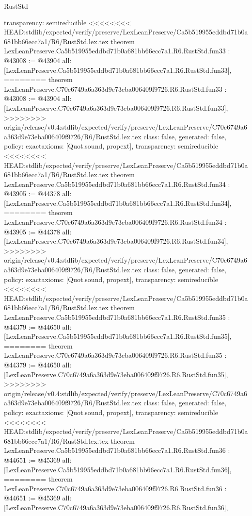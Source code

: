 \begin{lexlean}{RustStd}
\begin{coremodule}
{\begin{coremodule}
{{{{{{{{{{{{{{{{{{{{{{{{{{{{{{{{{{{{  transparency: semireducible
}
<<<<<<<< HEAD:stdlib/expected/verify/preserve/LexLeanPreserve/Ca5b519955eddbd71b0a681bb66ecc7a1/R6/RustStd.lex.tex
theorem LexLeanPreserve.Ca5b519955eddbd71b0a681bb66ecc7a1.R6.RustStd.fun33 : @43008 := @43904 {
  all: [LexLeanPreserve.Ca5b519955eddbd71b0a681bb66ecc7a1.R6.RustStd.fun33],
========
theorem LexLeanPreserve.C70c6749a6a363d9e73eba006409f9726.R6.RustStd.fun33 : @43008 := @43904 {
  all: [LexLeanPreserve.C70c6749a6a363d9e73eba006409f9726.R6.RustStd.fun33],
>>>>>>>> origin/release/v0.4:stdlib/expected/verify/preserve/LexLeanPreserve/C70c6749a6a363d9e73eba006409f9726/R6/RustStd.lex.tex
  class: false,
  generated: false,
  policy: exact{axioms: [Quot.sound, propext]},
  transparency: semireducible
}
<<<<<<<< HEAD:stdlib/expected/verify/preserve/LexLeanPreserve/Ca5b519955eddbd71b0a681bb66ecc7a1/R6/RustStd.lex.tex
theorem LexLeanPreserve.Ca5b519955eddbd71b0a681bb66ecc7a1.R6.RustStd.fun34 : @43905 := @44378 {
  all: [LexLeanPreserve.Ca5b519955eddbd71b0a681bb66ecc7a1.R6.RustStd.fun34],
========
theorem LexLeanPreserve.C70c6749a6a363d9e73eba006409f9726.R6.RustStd.fun34 : @43905 := @44378 {
  all: [LexLeanPreserve.C70c6749a6a363d9e73eba006409f9726.R6.RustStd.fun34],
>>>>>>>> origin/release/v0.4:stdlib/expected/verify/preserve/LexLeanPreserve/C70c6749a6a363d9e73eba006409f9726/R6/RustStd.lex.tex
  class: false,
  generated: false,
  policy: exact{axioms: [Quot.sound, propext]},
  transparency: semireducible
}
<<<<<<<< HEAD:stdlib/expected/verify/preserve/LexLeanPreserve/Ca5b519955eddbd71b0a681bb66ecc7a1/R6/RustStd.lex.tex
theorem LexLeanPreserve.Ca5b519955eddbd71b0a681bb66ecc7a1.R6.RustStd.fun35 : @44379 := @44650 {
  all: [LexLeanPreserve.Ca5b519955eddbd71b0a681bb66ecc7a1.R6.RustStd.fun35],
========
theorem LexLeanPreserve.C70c6749a6a363d9e73eba006409f9726.R6.RustStd.fun35 : @44379 := @44650 {
  all: [LexLeanPreserve.C70c6749a6a363d9e73eba006409f9726.R6.RustStd.fun35],
>>>>>>>> origin/release/v0.4:stdlib/expected/verify/preserve/LexLeanPreserve/C70c6749a6a363d9e73eba006409f9726/R6/RustStd.lex.tex
  class: false,
  generated: false,
  policy: exact{axioms: [Quot.sound, propext]},
  transparency: semireducible
}
<<<<<<<< HEAD:stdlib/expected/verify/preserve/LexLeanPreserve/Ca5b519955eddbd71b0a681bb66ecc7a1/R6/RustStd.lex.tex
theorem LexLeanPreserve.Ca5b519955eddbd71b0a681bb66ecc7a1.R6.RustStd.fun36 : @44651 := @45369 {
  all: [LexLeanPreserve.Ca5b519955eddbd71b0a681bb66ecc7a1.R6.RustStd.fun36],
========
theorem LexLeanPreserve.C70c6749a6a363d9e73eba006409f9726.R6.RustStd.fun36 : @44651 := @45369 {
  all: [LexLeanPreserve.C70c6749a6a363d9e73eba006409f9726.R6.RustStd.fun36],
}}}}}}}}}}}}}}}}}}}}}}}}}}}}}}}}}}}}}}}}
\end{coremodule}}
\end{coremodule}
\end{lexlean}

